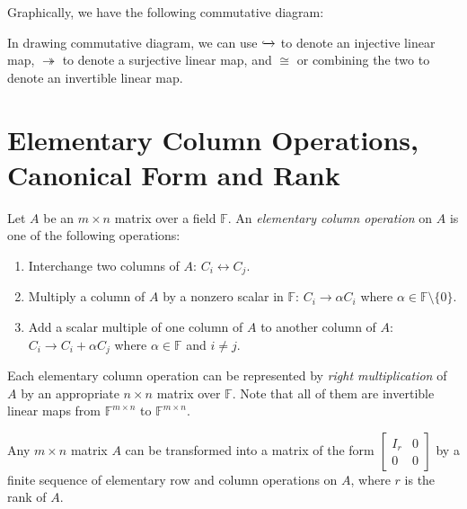 \documentclass[
	11pt, %
	fleqn, %
	a4paper, %
]{LegrandOrangeBook}
\newcommand{\F}{\mathbb{F}} %
\begin{document}
Graphically, we have the following commutative diagram:
\begin{center}
\end{center}

\begin{remark}
    In drawing commutative diagram, we can use $\xhookrightarrow{}$ to denote an injective linear map, $\twoheadrightarrow$ to denote a surjective linear map, and $\cong$ or combining the two to denote an invertible linear map.
\end{remark}

\newpage

\section{Elementary Column Operations, Canonical Form and Rank}

\begin{definition}
    Let $A$ be an $m \times n$ matrix over a field $\F$. An \emph{elementary column operation} on $A$ is one of the following operations:
    \begin{enumerate}
        \item Interchange two columns of $A$: $C_i \leftrightarrow C_j$.
        \item Multiply a column of $A$ by a nonzero scalar in $\F$: $C_i \to \alpha C_i$ where $\alpha \in \F \setminus \{0\}$.
        \item Add a scalar multiple of one column of $A$ to another column of $A$: $C_i \to C_i + \alpha C_j$ where $\alpha \in \F$ and $i \neq j$.
    \end{enumerate}
    Each elementary column operation can be represented by \emph{right multiplication} of $A$ by an appropriate $n \times n$ matrix over $\F$. Note that all of them are invertible linear maps from $\F^{m \times n}$ to $\F^{m \times n}$.
\end{definition}

\begin{proposition}
    Any $m \times n$ matrix $A$ can be transformed into a matrix of the form $\begin{bmatrix}
        I_r & 0 \\
        0 & 0
    \end{bmatrix}$ by a finite sequence of elementary row and column operations on $A$, where $r$ is the rank of $A$.
\end{proposition}
\end{document}
